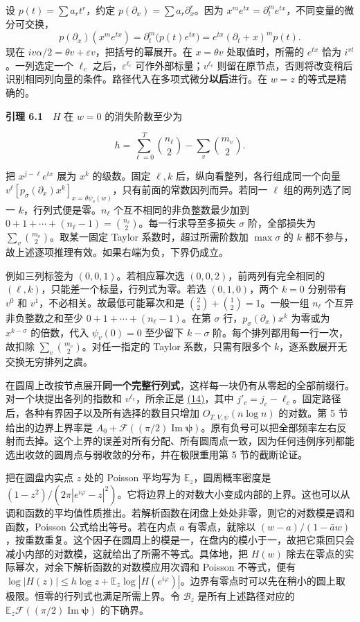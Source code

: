 \documentclass[11pt,a4paper]{article}
\begin{document}
设 \(p(t)=\sum a_rt^r\)，约定 \(p(\partial_x)=\sum a_r\partial_x^r\)。因为 \(x^me^{tx}=\partial_t^m e^{tx}\)，不同变量的微分可交换， \[
 p(\partial_x)(x^me^{tx})=\partial_t^m\big(p(t)e^{tx}\big)
 =e^{tx}(\partial_t+x)^mp(t).
\] 现在 \(iv\alpha/2=\theta v+\varepsilon v\)，把括号的幂展开。在 \(x=\theta v\) 处取值时，所需的 \(e^{tx}\) 恰为 \(i^{vt}\)。一列选定一个 \(\ell_c\) 之后，\(\varepsilon^{\ell_c}\) 可作外部标量；\(v^{\ell_c}\) 则留在原节点，否则将改变稍后识别相同列向量的条件。路径代入在多项式微分\textbf{以后}进行。在 \(w=z\) 的等式是精确的。

\textbf{引理 6.1}　\(H\) 在 \(w=0\) 的消失阶数至少为

\[
 h=\sum_{\ell=0}^T\binom{n_\ell}{2}-\sum_v\binom{m_v}{2}.                 \tag{17}\label{eq:17}
\]

把 \(x^{j-\ell}e^{tx}\) 展为 \(x^k\) 的级数。固定 \(\ell,k\) 后，纵向看整列，各行组成同一个向量 \(v^\ell[p_\sigma(\partial_x)x^k]_{x=\theta\psi_v(w)}\)，只有前面的常数因列而异。若同一 \(\ell\) 组的两列选了同一 \(k\)，行列式便是零。\(n_\ell\) 个互不相同的非负整数最少加到 \(0+1+\cdots+(n_\ell-1)=\binom{n_\ell}{2}\)。每一行求导至多损失 \(\sigma\) 阶，全部损失为 \(\sum_v\binom{m_v}{2}\)。取某一固定 Taylor 系数时，超过所需阶数加 \(\max\sigma\) 的 \(k\) 都不参与，故上述逐项推理有效。如果右端为负，下界仍成立。

例如三列标签为 \((0,0,1)\)。若相应幂次选 \((0,0,2)\)，前两列有完全相同的 \((\ell,k)\)，只能差一个标量，行列式为零。若选 \((0,1,0)\)，两个 \(k=0\) 分别带有 \(v^0\) 和 \(v^1\)，不必相关。故最低可能幂次和是 \(\binom22+\binom12=1\)。一般一组 \(n_\ell\) 个互异非负整数之和至少 \(0+1+\cdots+(n_\ell-1)\)。在第 \(\sigma\) 行，\(p_\sigma(\partial_x)x^k\) 为零或为 \(x^{k-\sigma}\) 的倍数，代入 \(\psi_v(0)=0\) 至少留下 \(k-\sigma\) 阶。每个排列都用每一行一次，故扣除 \(\sum_v\binom{m_v}{2}\)。对任一指定的 Taylor 系数，只需有限多个 \(k\)，逐系数展开无交换无穷排列之虞。

在圆周上改按节点展开\textbf{同一个完整行列式}，这样每一块仍有从零起的全部前缀行。对一个块提出各列的指数和 \(v^{\ell_c}\)，所余正是 \hyperref[eq:14]{(14)}，其中 \(j'_c=j_c-\ell_c\)。固定路径后，各种有界因子以及所有选择的数目只增加 \(O_{T,V,\psi}(n\log n)\) 的对数。第 5 节给出的边界上界率是 \(A_0+\mathcal F((\pi/2)\operatorname{Im}\boldsymbol\psi)\)。原有负号可以把全部频率左右反射而去掉。这个上界的误差对所有分配、所有圆周点一致，因为任何违例序列都能选出收敛的圆周点与弱收敛的分布，并在极限重用第 5 节的截断论证。

把在圆盘内实点 \(z\) 处的 Poisson 平均写为 \(\mathbb E_z\)，圆周概率密度是 \((1-z^2)/(2\pi|e^{i\varphi}-z|^2)\)。它将边界上的对数大小变成内部的上界。这也可以从调和函数的平均值性质推出。若解析函数在闭盘上处处非零，则它的对数模是调和函数，Poisson 公式给出等号。若在内点 \(a\) 有零点，就除以 \((w-a)/(1-\bar a w)\)，按重数重复。这个因子在圆周上的模是一，在盘内的模小于一，故把它乘回只会减小内部的对数模，这就给出了所需不等式。具体地，把 \(H(w)\) 除去在零点的实际幂次，对余下解析函数的对数模应用次调和 Poisson 不等式，便有 \(\log|H(z)|\le h\log z+\mathbb E_z\log|H(e^{i\varphi})|\)。边界有零点时可以先在稍小的圆上取极限。恒零的行列式也满足所需上界。令 \(\mathcal B_z\) 是所有上述路径对应的 \(\mathbb E_z\mathcal F((\pi/2)\operatorname{Im}\boldsymbol\psi)\) 的下确界。
\end{document}
